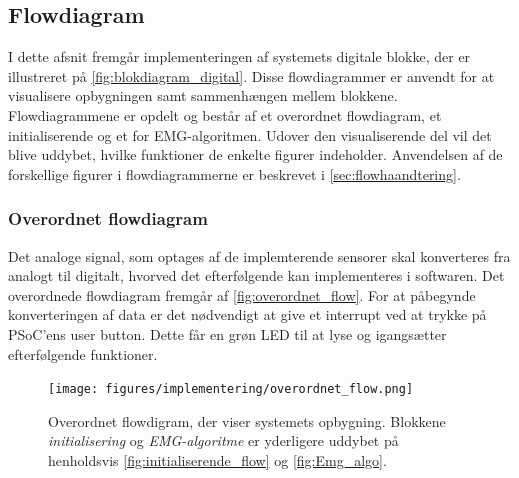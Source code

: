 \subsection{Flowdiagram}
I dette afsnit fremgår implementeringen af systemets digitale blokke, der er illustreret på \autoref{fig:blokdiagram_digital}. Disse flowdiagrammer er anvendt for at visualisere opbygningen samt sammenhængen mellem blokkene. Flowdiagrammene er opdelt og består af et overordnet flowdiagram, et initialiserende og et for EMG-algoritmen. Udover den visualiserende del vil det blive uddybet, hvilke funktioner de enkelte figurer indeholder. Anvendelsen af de forskellige figurer i flowdiagrammerne er beskrevet i \autoref{sec:flowhaandtering}.

\subsubsection{Overordnet flowdiagram}
Det analoge signal, som optages af de implemterende sensorer skal konverteres fra analogt til digitalt, hvorved det efterfølgende kan implementeres i softwaren. Det overordnede flowdiagram fremgår af \autoref{fig:overordnet_flow}. For at påbegynde konverteringen af data er det nødvendigt at give et interrupt ved at trykke på PSoC'ens user button. Dette får en grøn LED til at lyse og igangsætter efterfølgende funktioner. 
\begin{figure}[H]
\centering
\texttt{[image: figures/implementering/overordnet\_flow.png]}
\caption{Overordnet flowdigram, der viser systemets opbygning. Blokkene \emph{initialisering} og \emph{EMG-algoritme} er yderligere uddybet på henholdsvis \autoref{fig:initialiserende_flow} og \autoref{fig:Emg_algo}.}
\label{fig:overordnet_flow}
\end{figure}

